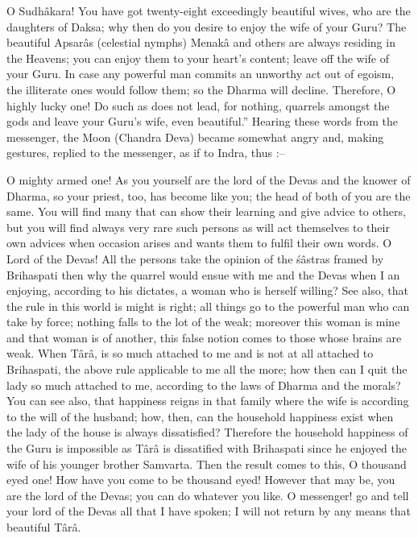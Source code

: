 O Sudh\^akara! You have got twenty-eight exceedingly beautiful wives, who are the daughters of Daksa; why then do you desire to enjoy the wife of your Guru? The beautiful Apsar\^as (celestial nymphs) Menak\^a and others are always residing in the Heavens; you can enjoy them to your heart's content; leave off the wife of your Guru. In case any powerful man commits an unworthy act out of egoism, the illiterate ones would follow them; so the Dharma will decline. Therefore, O highly lucky one! Do such as does not lead, for nothing, quarrels amongst the gods and leave your Guru's wife, even beautiful.'' Hearing these words from the messenger, the Moon (Chandra Deva) became somewhat angry and, making gestures, replied to the messenger, as if to Indra, thus :--

O mighty armed one! As you yourself are the lord of the Devas and the knower of Dharma, so your priest, too, has become like you; the head of both of you are the same. You will find many that can show their learning and give advice to others, but you will find always very rare such persons as will act themselves to their own advices when occasion arises and wants them to fulfil their own words. O Lord of the Devas! All the persons take the opinion of the \'s\^astras framed by Brihaspati then why the quarrel would ensue with me and the Devas when I an enjoying, according to his dictates, a woman who is herself willing? See also, that the rule in this world is might is right; all things go to the powerful man who can take by force; nothing falls to the lot of the weak; moreover this woman is mine and that woman is of another, this false notion comes to those whose brains are weak. When T\^ar\^a, is so much attached to me and is not at all attached to Brihaspati, the above rule applicable to me all the more; how then can I quit the lady so much attached to me, according to the laws of Dharma and the morals? You can see also, that happiness reigns in that family where the wife is according to the will of the husband; how, then, can the household happiness exist when the lady of the house is always dissatisfied? Therefore the household happiness of the Guru is impossible as T\^ar\^a is dissatified with Brihaspati since he enjoyed the wife of his younger brother Samvarta. Then the result comes to this, O thousand eyed one! How have you come to be thousand eyed! However that may be, you are the lord of the Devas; you can do whatever you like. O messenger! go and tell your lord of the Devas all that I have spoken; I will not return by any means that beautiful T\^ar\^a.

